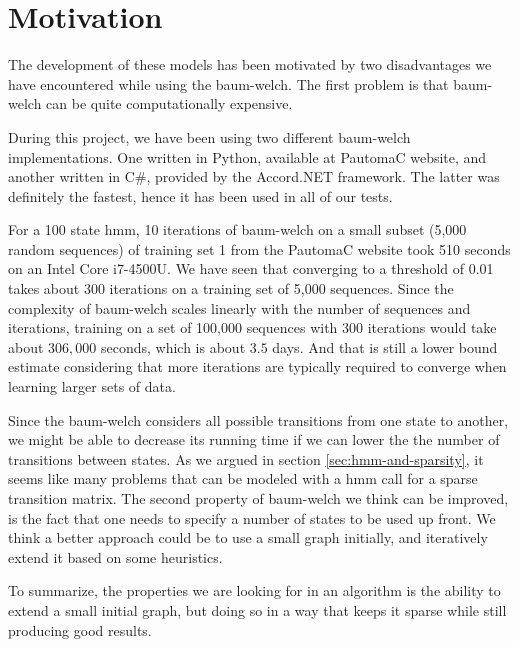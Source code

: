 \section{Motivation}
The development of these models has been motivated by two disadvantages we have encountered while using the \gls{baum-welch}.
The first problem is that \gls{baum-welch} can be quite computationally expensive.

During this project, we have been using two different \gls{baum-welch} implementations. One written in Python, available at PautomaC website, and another written in C\#, provided by the Accord.NET framework. The latter was definitely the fastest, hence it has been used in all of our tests.

For a 100 state \gls{hmm}, 10 iterations of \gls{baum-welch} on a small subset (5,000 random sequences) of training set 1 from the PautomaC website took 510 seconds on an Intel Core i7-4500U. We have seen that converging to a threshold of 0.01 takes about 300 iterations on a training set of 5,000 sequences. Since the complexity of \gls{baum-welch} scales linearly with the number of sequences and iterations, training on a set of 100,000 sequences with 300 iterations would take about $306,000$ seconds, which is about $3.5$ days. And that is still a lower bound estimate considering that more iterations are typically required to converge when learning larger sets of data.

Since the \gls{baum-welch} considers all possible transitions from one state to another, we might be able to decrease its running time if we can lower the the number of transitions between states. As we argued in section \ref{sec:hmm-and-sparsity}, it seems like many problems that can be modeled with a \gls{hmm} call for a sparse transition matrix.
The second property of \gls{baum-welch} we think can be improved, is the fact that one needs to specify a number of states to be used up front.
We think a better approach could be to use a small graph initially, and iteratively extend it based on some heuristics.

To summarize, the properties we are looking for in an algorithm is the ability to extend a small initial graph, but doing so in a way that keeps it sparse while still producing good results.